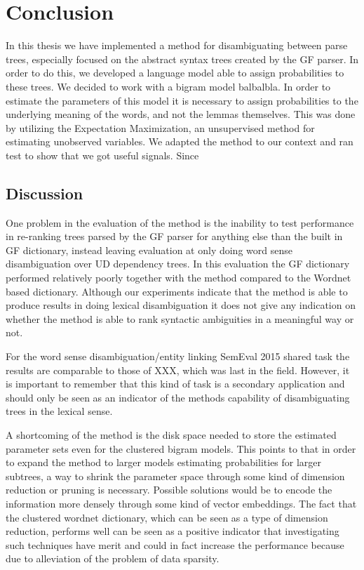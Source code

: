 \chapter{Conclusion}
\label{chapter:conclusion}
In this thesis we have implemented a method for disambiguating between parse trees, especially focused on the abstract syntax trees created by the GF parser. In order to do this, we developed a language model able to assign probabilities to these trees. We decided to work with a bigram model balbalbla. In order to estimate the parameters of this model it is necessary to assign probabilities to the underlying meaning of the words, and not the lemmas themselves. This was done by utilizing the Expectation Maximization, an unsupervised method for estimating unobserved variables. We adapted the method to our context and ran test to show that we got useful signals. Since 

\section{Discussion}
One problem in the evaluation of the method is the inability to test performance in re-ranking trees parsed by the GF parser for anything else than the built in GF dictionary, instead leaving evaluation at only doing word sense disambiguation over UD dependency trees. In this evaluation the GF dictionary performed relatively poorly together with the method compared to the Wordnet based dictionary. Although our experiments indicate that the method is able to produce results in doing lexical disambiguation it does not give any indication on whether the method is able to rank syntactic ambiguities in a meaningful way or not.

For the word sense disambiguation/entity linking SemEval 2015 shared task the results are comparable to those of XXX, which was last in the field. However, it is important to remember that this kind of task is a secondary application and should only be seen as an indicator of the methods capability of disambiguating trees in the lexical sense. 

A shortcoming of the method is the disk space needed to store the estimated parameter sets even for the clustered bigram models. This points to that in order to expand the method to larger models estimating probabilities for larger subtrees, a way to shrink the parameter space through some kind of dimension reduction or pruning is necessary. Possible solutions would be to encode the information more densely through some kind of vector embeddings. The fact that the clustered wordnet dictionary, which can be seen as a type of dimension reduction, performs well can be seen as a positive indicator that investigating such techniques have merit and could in fact increase the performance because due to alleviation of the problem of data sparsity.


